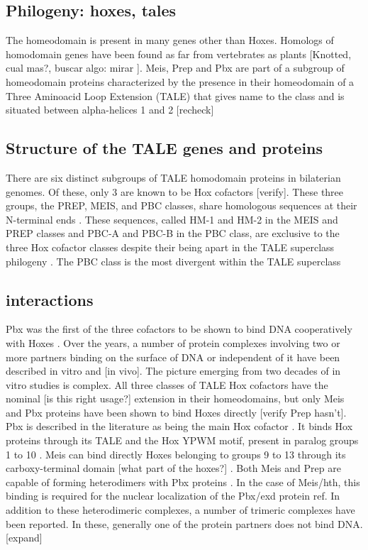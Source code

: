 \subsection{Philogeny: hoxes, tales}
The homeodomain is present in many genes other than Hoxes. Homologs of homodomain genes have been found as far from vertebrates as plants [Knotted, cual mas?, buscar algo: mirar \cite{Burglin1997}]. Meis, Prep and Pbx are part of a subgroup of homeodomain proteins characterized by the presence in their homeodomain of a Three Aminoacid Loop Extension (TALE) that gives name to the class and is situated between alpha-helices 1 and 2 [recheck] \cite{Burglin1997, Mukherjee2007, Moens2006}

\subsection{Structure of the TALE genes and proteins}
	
		There are six distinct subgroups of TALE homodomain proteins in bilaterian genomes. Of these, only 3 are known to be Hox cofactors [verify]. These three groups, the PREP, MEIS, and PBC classes, share homologous sequences at their N-terminal ends \cite{Burglin1998}. These sequences, called HM-1 and HM-2 in the MEIS and PREP classes and PBC-A and PBC-B in the PBC class, are exclusive to the three Hox cofactor classes despite their being apart in the TALE superclass philogeny \cite{Mukherjee2007}.
		The PBC class is the most divergent within the TALE superclass

\subsection{interactions}

		Pbx was the first of the three cofactors to be shown to bind DNA cooperatively with Hoxes \cite{ref}. Over the years, a number of protein complexes involving two or more partners binding on the surface of DNA or independent of it have been described in vitro and [in vivo]. The picture emerging from two decades of in vitro studies is complex. 
		All three classes of TALE Hox cofactors have the nominal [is this right usage?] extension in their homeodomains, but only Meis and Pbx proteins have been shown to bind Hoxes directly [verify Prep hasn't]. Pbx is described in the literature as being the main Hox cofactor \cite{ref}. It binds Hox proteins through its TALE and the Hox YPWM motif, present in paralog groups 1 to 10 \cite{refs, Passner1999}. Meis can bind directly Hoxes belonging to groups 9 to 13 through its carboxy-terminal domain [what part of the hoxes?] \cite{ref}. 
		Both Meis and Prep are capable of forming heterodimers with Pbx proteins \cite{ref}. In the case of Meis/hth, this binding is required for the nuclear localization of the Pbx/exd protein {ref}. 
		In addition to these heterodimeric complexes, a number of trimeric complexes have been reported. In these, generally one of the protein partners does not bind DNA. [expand]

